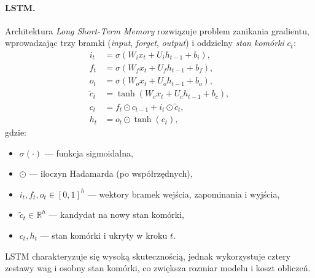 \documentclass[12pt,a4paper]{article}
\begin{document}
\paragraph{LSTM.}
Architektura \textit{Long Short-Term Memory} \citep{hochreiter1997lstm} rozwiązuje problem zanikania gradientu, wprowadzając trzy bramki (\emph{input}, \emph{forget}, \emph{output}) i oddzielny \emph{stan komórki} $c_t$:
\begin{equation}
\begin{aligned}
i_t &= \sigma(W_i x_t + U_i h_{t-1} + b_i), \\
f_t &= \sigma(W_f x_t + U_f h_{t-1} + b_f), \\
o_t &= \sigma(W_o x_t + U_o h_{t-1} + b_o), \\
\tilde c_t &= \tanh(W_c x_t + U_c h_{t-1} + b_c), \\
c_t &= f_t \odot c_{t-1} + i_t \odot \tilde c_t, \\
h_t &= o_t \odot \tanh(c_t),
\end{aligned}
\end{equation}
gdzie:
\begin{itemize}[leftmargin=1.5em]
    \item $\sigma(\cdot)$ --- funkcja sigmoidalna,
    \item $\odot$ --- iloczyn Hadamarda (po współrzędnych),
    \item $i_t, f_t, o_t \in [0,1]^h$ --- wektory bramek wejścia, zapominania i wyjścia,
    \item $\tilde c_t \in \mathbb{R}^h$ --- kandydat na nowy stan komórki,
    \item $c_t, h_t$ --- stan komórki i ukryty w kroku $t$.
\end{itemize}
LSTM charakteryzuje się wysoką skutecznością, jednak wykorzystuje cztery zestawy wag i osobny stan komórki, co zwiększa rozmiar modelu i koszt obliczeń.
\end{document}
